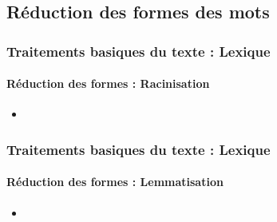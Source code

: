 \documentclass[xcolor=table]{beamer}
\begin{document}
\subsection{Réduction des formes des mots}

\begin{frame}
\frametitle{Traitements basiques du texte : Lexique}
\framesubtitle{Réduction des formes : Racinisation}

\begin{itemize}
\item 
\end{itemize}

\end{frame}

\begin{frame}
\frametitle{Traitements basiques du texte : Lexique}
\framesubtitle{Réduction des formes : Lemmatisation}

\begin{itemize}
	\item 
\end{itemize}

\end{frame}

\end{document}
